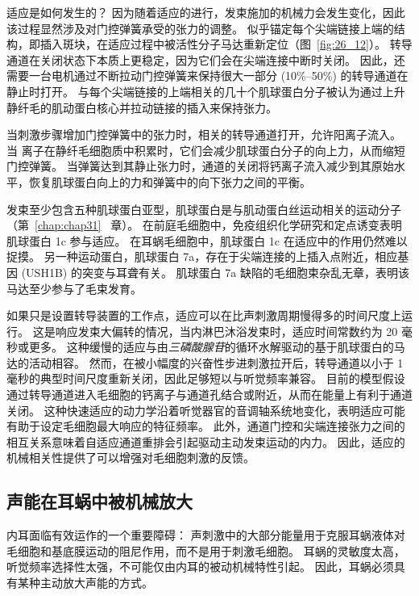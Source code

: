 适应是如何发生的？
因为随着适应的进行，发束施加的机械力会发生变化，因此该过程显然涉及对门控弹簧承受的张力的调整。
似乎锚定每个尖端链接上端的结构，即插入斑块，在适应过程中被活性分子马达重新定位（图~\ref{fig:26_12}）。
转导通道在关闭状态下本质上更稳定，因为它们会在尖端连接中断时关闭。
因此，还需要一台电机通过不断拉动门控弹簧来保持很大一部分 (10\%–50\%) 的转导通道在静止时打开。
与每个尖端链接的上端相关的几十个肌球蛋白分子被认为通过上升静纤毛的肌动蛋白核心并拉动链接的插入来保持张力。


当刺激步骤增加门控弹簧中的张力时，相关的转导通道打开，允许阳离子流入。
当  离子在静纤毛细胞质中积累时，它们会减少肌球蛋白分子的向上力，从而缩短门控弹簧。
当弹簧达到其静止张力时，通道的关闭将钙离子流入减少到其原始水平，恢复肌球蛋白向上的力和弹簧中的向下张力之间的平衡。


发束至少包含五种肌球蛋白亚型，肌球蛋白是与肌动蛋白丝运动相关的运动分子（第~\ref{chap:chap31}~ 章）。
在前庭毛细胞中，免疫组织化学研究和定点诱变表明肌球蛋白 1c 参与适应。
在耳蜗毛细胞中，肌球蛋白 1c 在适应中的作用仍然难以捉摸。
另一种运动蛋白，肌球蛋白 7a，存在于尖端连接的上插入点附近，相应基因 (USH1B) 的突变与耳聋有关。
肌球蛋白 7a 缺陷的毛细胞束杂乱无章，表明该马达至少参与了毛束发育。


如果只是设置转导装置的工作点，适应可以在比声刺激周期慢得多的时间尺度上运行。
这是响应发束大偏转的情况，当内淋巴沐浴发束时，适应时间常数约为 20 毫秒或更多。
这种缓慢的适应与由\textit{三磷酸腺苷}的循环水解驱动的基于肌球蛋白的马达的活动相容。
然而，在被小幅度的兴奋性步进刺激拉开后，转导通道以小于 1 毫秒的典型时间尺度重新关闭，因此足够短以与听觉频率兼容。
目前的模型假设通过转导通道进入毛细胞的钙离子与通道孔结合或附近，从而在能量上有利于通道关闭。
这种快速适应的动力学沿着听觉器官的音调轴系统地变化，表明适应可能有助于设定毛细胞最大响应的特征频率。
此外，通道门控和尖端连接张力之间的相互关系意味着自适应通道重排会引起驱动主动发束运动的内力。
因此，适应的机械相关性提供了可以增强对毛细胞刺激的反馈。


\subsection{声能在耳蜗中被机械放大}

内耳面临有效运作的一个重要障碍：
声刺激中的大部分能量用于克服耳蜗液体对毛细胞和基底膜运动的阻尼作用，而不是用于刺激毛细胞。
耳蜗的灵敏度太高，听觉频率选择性太强，不可能仅由内耳的被动机械特性引起。
因此，耳蜗必须具有某种主动放大声能的方式。


